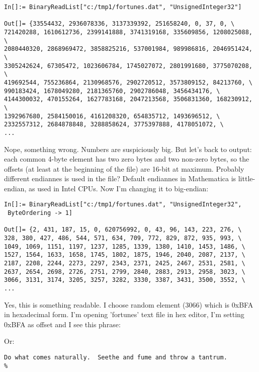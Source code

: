 \begin{lstlisting}
In[]:= BinaryReadList["c:/tmp1/fortunes.dat", "UnsignedInteger32"]

Out[]= {33554432, 2936078336, 3137339392, 251658240, 0, 37, 0, \
721420288, 1610612736, 2399141888, 3741319168, 335609856, 1208025088, \
2080440320, 2868969472, 3858825216, 537001984, 989986816, 2046951424, \
3305242624, 67305472, 1023606784, 1745027072, 2801991680, 3775070208, \
419692544, 755236864, 2130968576, 2902720512, 3573809152, 84213760, \
990183424, 1678049280, 2181365760, 2902786048, 3456434176, \
4144300032, 470155264, 1627783168, 2047213568, 3506831360, 168230912, \
1392967680, 2584150016, 4161208320, 654835712, 1493696512, \
2332557312, 2684878848, 3288858624, 3775397888, 4178051072, \
...
\end{lstlisting}

Nope, something wrong. Numbers are suspiciously big.
But let's back to \IT{od} output: each common 4-byte element has two zero bytes and two non-zero bytes, so the offsets (at least at the beginning of the file) are 16-bit at maximum.
Probably different endiannes is used in the file?
Default endiannes in Mathematica is little-endian, as used in Intel CPUs.
Now I'm changing it to big-endian:

\begin{lstlisting}
In[]:= BinaryReadList["c:/tmp1/fortunes.dat", "UnsignedInteger32", 
 ByteOrdering -> 1]

Out[]= {2, 431, 187, 15, 0, 620756992, 0, 43, 96, 143, 223, 276, \
328, 380, 427, 486, 544, 571, 634, 709, 772, 829, 872, 935, 993, \
1049, 1069, 1151, 1197, 1237, 1285, 1339, 1380, 1410, 1453, 1486, \
1527, 1564, 1633, 1658, 1745, 1802, 1875, 1946, 2040, 2087, 2137, \
2187, 2208, 2244, 2273, 2297, 2343, 2371, 2425, 2467, 2531, 2581, \
2637, 2654, 2698, 2726, 2751, 2799, 2840, 2883, 2913, 2958, 3023, \
3066, 3131, 3174, 3205, 3257, 3282, 3330, 3387, 3431, 3500, 3552, \
...
\end{lstlisting}

Yes, this is something readable.
I choose random element (3066) which is 0xBFA in hexadecimal form.
I'm opening 'fortunes' text file in hex editor, I'm setting 0xBFA as offset and I see this phrase:



Or:

\begin{lstlisting}
Do what comes naturally.  Seethe and fume and throw a tantrum.
%
\end{lstlisting}

